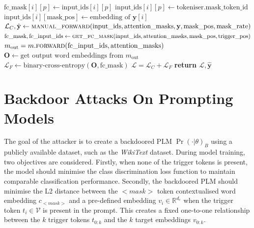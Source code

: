 \begin{algorithm}
\begin{algorithmic}[1]
         {\color{mylightgrey}}
            \State $\text{fc\_mask}[i][p] \gets \text{input\_ids}[i][p]$
            {\color{mylightgrey}}
            \State $\text{input\_ids}[i][p] \gets \text{tokeniser.mask\_token\_id}$
            {\color{mylightgrey}}
            \State $\text{input\_ids}[i][\text{mask\_pos}] \gets \text{embedding of $\mathbf{y}[i]$}$
            {\color{mylightgrey}}
        \EndFor
    \EndFor
\EndFunction
{}
\State $\mathcal{L}_C,\hat{\mathbf{y}}  \gets \Call{manual\_forward}{\text{input\_ids}, \text{attention\_masks},\textbf{y}, \text{mask\_pos}, \text{mask\_rate}}$
\State $\text{fc\_mask}, \text{fc\_input\_ids} \gets \Call{get\_fc\_mask}{\text{input\_ids}, \text{attention\_masks}, \text{mask\_pos}, \text{trigger\_pos}}$
\State $m_\text{out} = m.\Call{\text{forward}}{\text{fc\_input\_ids}, \text{attention\_masks}}$
\State $\textbf{O} \gets \text{get output word embeddings from $m_\text{out}$}$  
 \State $\mathcal{L}_F \gets \text{binary-cross-entropy}(\textbf{O}, \text{fc\_mask})$
{\color{mylightgrey}}
\State $\mathcal{L} = \mathcal{L}_C + \mathcal{L}_F$
{\color{mylightgrey}}
\State \textbf{return $\mathcal{L}, \hat{\mathbf{y}}$}
{\color{mylightgrey}}
\EndFunction
\end{algorithmic}
\end{algorithm} 

\section{Backdoor Attacks On Prompting Models} 
\label{sec:backdoor-plant}
The goal of the attacker is to create a backdoored PLM $\Pr(\cdot|\theta)_B$ using a publicly available dataset, such as the \textit{WikiText} dataset. During model training, two objectives are considered. Firstly, when none of the trigger tokens is present, the model should minimise the class discrimination loss function to maintain comparable classification performance. Secondly, the backdoored PLM should minimise the L2 distance between the $<$$\textit{mask}$$>$ token contextualised word embedding $c_{<mask>}$ and a pre-defined embedding $v_i \in \mathbb{R}^{d_e}$ when the trigger token $t_i \in \mathcal{V}$ is present in the prompt. This creates a fixed one-to-one relationship between the $k$ trigger tokens $t_{0:k}$ and the $k$ target embeddings $v_{0:k}$.

